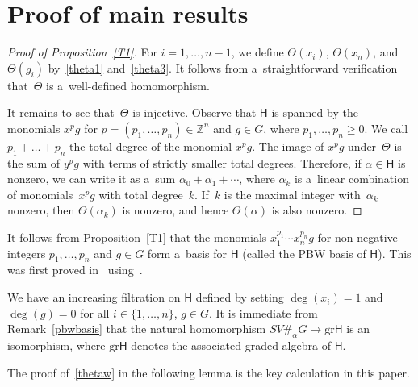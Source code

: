 \section{Proof of main results}\label{Section2}

\begin{proof}
[Proof of Proposition~\ref{T1}]
For $i=1,\ldots, n-1$, we def\/ine $\Theta(x_i)$, $\Theta(x_n)$, and $\Theta(g_i)$
by~\eqref{theta1} and~\eqref{theta3}.
It follows from a~straightforward verif\/ication that~$\Theta$ is a~well-def\/ined homomorphism.



It remains to see that~$\Theta$ is injective.
Observe that $\mathsf{H}$ is spanned by the monomials $x^p g$ for $p=(p_1,\dots,p_n)\in {\mathbb{Z}}^n$ and $g\in G$,
where $p_1,\ldots, p_n\ge 0$.
We call $p_1+\dots+p_n$ the total degree of the monomial $x^p g$.
The image of $x^p g$ under~$\Theta$ is the sum of $y^p g$ with terms of strictly smaller total degrees.
Therefore, if $\alpha\in \mathsf{H}$ is nonzero, we can write it as a~sum $\alpha_0 + \alpha_1 + \cdots$, where
$\alpha_k$ is a~linear combination of monomials~$x^p g$ with total degree~$k$.
If~$k$ is the maximal integer with~$\alpha_k$ nonzero, then $\Theta(\alpha_k)$ is nonzero, and hence $\Theta(\alpha)$ is
also nonzero.
\end{proof}

\begin{Remark}
\label{pbwbasis}
It follows from Proposition~\ref{T1} that the monomials $x_1^{p_1}\cdots x_n^{p_n} g$ for non-negative integers $p_1,
\ldots, p_n$ and $g\in G$ form a~basis for $\mathsf{H}$ (called the PBW basis of $\mathsf{H}$).
This was f\/irst proved in~\cite[Example 2.16]{W} using~\cite[Theorem 2.10]{W}.
\end{Remark}

We have an increasing f\/iltration on $\mathsf{H}$ def\/ined by setting $\deg(x_i)=1$ and $\deg(g)=0$ for all
$i\in\{1,\ldots,n\}$, $g\in G$.
It is immediate from Remark~\ref{pbwbasis} that the natural homomorphism $SV\#_\alpha G \to {\mathrm{gr}} \mathsf{H}$ is
an isomorphism, where ${\mathrm{gr}} \mathsf{H}$ denotes the associated graded algebra of $\mathsf{H}$.

The proof of~\eqref{thetaw} in the following lemma is the key calculation in this paper.

